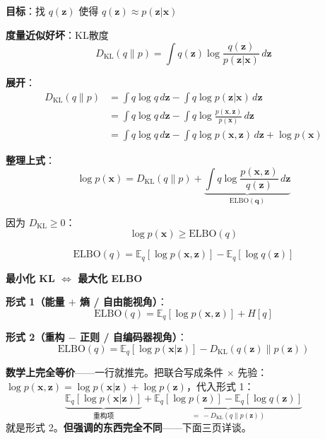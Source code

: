 \documentclass[12pt, a4paper]{ctexart}
\begin{document}
\begin{blackboard}

\textbf{目标}：找 $q(\mathbf{z})$ 使得 $q(\mathbf{z}) \approx p(\mathbf{z} | \mathbf{x})$

\textbf{度量近似好坏}：KL散度
\[
D_{\text{KL}}(q \| p) = \int q(\mathbf{z}) \log \frac{q(\mathbf{z})}{p(\mathbf{z} | \mathbf{x})} \, d\mathbf{z}
\]

\textbf{展开}：
\begin{align*}
D_{\text{KL}}(q \| p) &= \int q \log q \, d\mathbf{z} - \int q \log p(\mathbf{z} | \mathbf{x}) \, d\mathbf{z} \\
&= \int q \log q \, d\mathbf{z} - \int q \log \frac{p(\mathbf{x}, \mathbf{z})}{p(\mathbf{x})} \, d\mathbf{z} \\
&= \int q \log q \, d\mathbf{z} - \int q \log p(\mathbf{x}, \mathbf{z}) \, d\mathbf{z} + \log p(\mathbf{x})
\end{align*}

\end{blackboard}

\begin{blackboard}

\textbf{整理上式}：
\[
\log p(\mathbf{x}) = D_{\text{KL}}(q \| p) + \underbrace{\int q \log \frac{p(\mathbf{x}, \mathbf{z})}{q(\mathbf{z})} \, d\mathbf{z}}_{\text{ELBO}(\mathbf{q})}
\]

因为 $D_{\text{KL}} \geq 0$：
\[
\log p(\mathbf{x}) \geq \text{ELBO}(q)
\]

\begin{keypoint}[ELBO]
\[
\boxed{\text{ELBO}(q) = \mathbb{E}_q[\log p(\mathbf{x}, \mathbf{z})] - \mathbb{E}_q[\log q(\mathbf{z})]}
\]

\textbf{最小化 KL $\Leftrightarrow$ 最大化 ELBO}
\end{keypoint}

\end{blackboard}

\begin{blackboard}

\textbf{形式 1（能量 $+$ 熵 / 自由能视角）}：
\[
\mathrm{ELBO}(q) = \mathbb{E}_q[\log p(\mathbf{x}, \mathbf{z})] + H[q]
\]

\textbf{形式 2（重构 $-$ 正则 / 自编码器视角）}：
\[
\mathrm{ELBO}(q) = \mathbb{E}_q[\log p(\mathbf{x} | \mathbf{z})] - D_{\mathrm{KL}}(q(\mathbf{z}) \| p(\mathbf{z}))
\]

\textbf{数学上完全等价}——一行就推完。把联合写成条件 $\times$ 先验：
$\log p(\mathbf{x}, \mathbf{z}) = \log p(\mathbf{x}|\mathbf{z}) + \log p(\mathbf{z})$，代入形式 1：
\[
\underbrace{\mathbb{E}_q[\log p(\mathbf{x}|\mathbf{z})]}_{\text{重构项}}
+ \underbrace{\mathbb{E}_q[\log p(\mathbf{z})] - \mathbb{E}_q[\log q(\mathbf{z})]}_{=\,-D_{\mathrm{KL}}(q\|p(\mathbf{z}))}
\]
就是形式 2。\textbf{但强调的东西完全不同}——下面三页详谈。

\end{blackboard}
\end{document}
